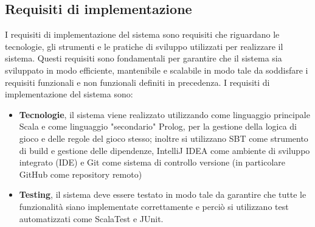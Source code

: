 \subsection{Requisiti di implementazione} \label{subsec:implementation_requirements}
I requisiti di implementazione del sistema sono requisiti che riguardano le tecnologie, gli strumenti e le pratiche di sviluppo
utilizzati per realizzare il sistema. Questi requisiti sono fondamentali per garantire che il sistema sia sviluppato in modo
efficiente, mantenibile e scalabile in modo tale da soddisfare i requisiti funzionali e non funzionali definiti in precedenza.
I requisiti di implementazione del sistema sono:
\begin{itemize}
    \item \textbf{Tecnologie}, il sistema viene realizzato utilizzando come linguaggio principale Scala e come 
    linguaggio "secondario" Prolog, per la gestione della logica di gioco e delle regole del gioco stesso; inoltre si utilizzano
    SBT come strumento di build e gestione delle dipendenze, IntelliJ IDEA come ambiente di sviluppo integrato (IDE) e Git come
    sistema di controllo versione (in particolare GitHub come repository remoto)
    \item \textbf{Testing}, il sistema deve essere testato in modo tale da garantire che tutte le funzionalità siano implementate
    correttamente e perciò si utilizzano test automatizzati come ScalaTest e JUnit.
\end{itemize}